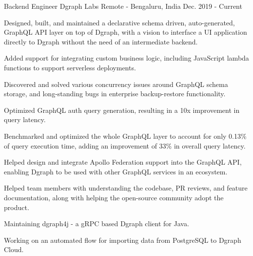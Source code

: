 

\begin{cventries}

  \cventry
    {Backend Engineer} %
    {Dgraph Labs} %
    {Remote - Bengaluru, India} %
    {Dec. 2019 - Current} %
    {
      \begin{cvitems} %
        \item {Designed, built, and maintained a declarative schema driven, auto-generated, GraphQL API layer on top of Dgraph, with a vision to interface a UI application directly to Dgraph without the need of an intermediate backend.}
	\item {Added support for integrating custom business logic, including JavaScript lambda functions to support serverless deployments.}
	\item {Discovered and solved various concurrency issues around GraphQL schema storage, and long-standing bugs in enterprise backup-restore functionality.}
	\item {Optimized GraphQL auth query generation, resulting in a 10x improvement in query latency.}
	\item {Benchmarked and optimized the whole GraphQL layer to account for only 0.13\% of query execution time, adding an improvement of 33\% in overall query latency.}
	\item {Helped design and integrate Apollo Federation support into the GraphQL API, enabling Dgraph to be used with other GraphQL services in an ecosystem.}
	\item {Helped team members with understanding the codebase, PR reviews, and feature documentation, along with helping the open-source community adopt the product.}
	\item {Maintaining dgraph4j - a gRPC based Dgraph client for Java.}
	\item {Working on an automated flow for importing data from PostgreSQL to Dgraph Cloud.}
      \end{cvitems}
    }


\end{cventries}
